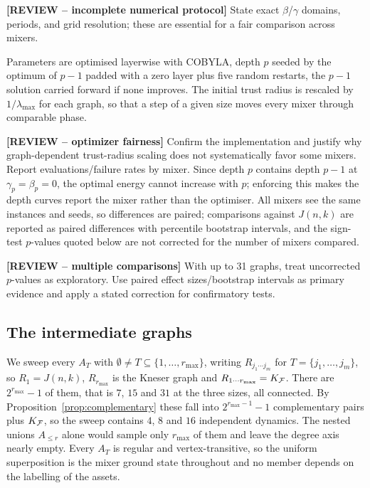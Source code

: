 {\color{red}\textbf{[REVIEW -- incomplete numerical protocol]} State exact $\beta$/$\gamma$ domains, periods, and grid resolution; these are essential for a fair comparison across mixers.}

Parameters are optimised layerwise with COBYLA, depth $p$ seeded by the
optimum of $p-1$ padded with a zero layer plus five random restarts, the
$p-1$ solution carried forward if none improves. The initial trust radius
is rescaled by $1/\lambda_{\max}$ for each graph, so that a step of a
given size moves every mixer through comparable phase.

{\color{red}\textbf{[REVIEW -- optimizer fairness]} Confirm the implementation and justify why graph-dependent trust-radius scaling does not systematically favor some mixers. Report evaluations/failure rates by mixer.}
Since depth $p$ contains
depth $p-1$ at $\gamma_p=\beta_p=0$, the optimal energy cannot increase
with $p$; enforcing this makes the depth curves report the mixer rather
than the optimiser. All mixers see the same instances and seeds, so
differences are paired; comparisons against $J(n,k)$ are reported as
paired differences with percentile bootstrap intervals, and the sign-test
$p$-values quoted below are not corrected for the number of mixers
compared.

{\color{red}\textbf{[REVIEW -- multiple comparisons]} With up to 31 graphs, treat uncorrected $p$-values as exploratory. Use paired effect sizes/bootstrap intervals as primary evidence and apply a stated correction for confirmatory tests.}

\subsection{\label{sec:intermediate}The intermediate graphs}
We sweep every $A_T$ with $\emptyset\neq T\subseteq\{1,\dots,r_{\max}\}$,
writing $R_{j_1\cdots j_m}$ for $T=\{j_1,\dots,j_m\}$, so $R_1=J(n,k)$,
$R_{r_{\max}}$ is the Kneser graph and $R_{1\cdots r_{\max}}=K_{\mathcal{F}}$.
There are $2^{r_{\max}}-1$ of them, that is $7$, $15$ and $31$ at the
three sizes, all connected. By Proposition~\ref{prop:complementary} these
fall into $2^{r_{\max}-1}-1$ complementary pairs plus $K_{\mathcal{F}}$, so the
sweep contains $4$, $8$ and $16$ independent dynamics. The nested unions $A_{\le r}$ alone would
sample only $r_{\max}$ of them and leave the degree axis nearly empty.
Every $A_T$ is regular and vertex-transitive, so the uniform
superposition is the mixer ground state throughout and no member depends
on the labelling of the assets.

